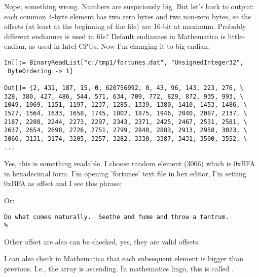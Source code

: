Nope, something wrong. Numbers are suspiciously big.
But let's back to  output: each common 4-byte element has two zero bytes and two non-zero bytes, so the offsets (at least at the beginning of the file) are 16-bit at maximum.
Probably different endiannes is used in file?
Default endiannes in Mathematica is little-endian, as used in Intel CPUs.
Now I'm changing it to big-endian:

\begin{lstlisting}
In[]:= BinaryReadList["c:/tmp1/fortunes.dat", "UnsignedInteger32", 
 ByteOrdering -> 1]

Out[]= {2, 431, 187, 15, 0, 620756992, 0, 43, 96, 143, 223, 276, \
328, 380, 427, 486, 544, 571, 634, 709, 772, 829, 872, 935, 993, \
1049, 1069, 1151, 1197, 1237, 1285, 1339, 1380, 1410, 1453, 1486, \
1527, 1564, 1633, 1658, 1745, 1802, 1875, 1946, 2040, 2087, 2137, \
2187, 2208, 2244, 2273, 2297, 2343, 2371, 2425, 2467, 2531, 2581, \
2637, 2654, 2698, 2726, 2751, 2799, 2840, 2883, 2913, 2958, 3023, \
3066, 3131, 3174, 3205, 3257, 3282, 3330, 3387, 3431, 3500, 3552, \
...
\end{lstlisting}

Yes, this is something readable.
I choose random element (3066) which is 0xBFA in hexadecimal form.
I'm opening 'fortunes' text file in hex editor, I'm setting 0xBFA as offset and I see this phrase:



Or:

\begin{lstlisting}
Do what comes naturally.  Seethe and fume and throw a tantrum.
%
\end{lstlisting}

Other offset are also can be checked, yes, they are valid offsets.

I can also check in Mathematica that each subsequent element is bigger than previous.
I.e., the array is ascending.
In mathematics lingo, this is called .

